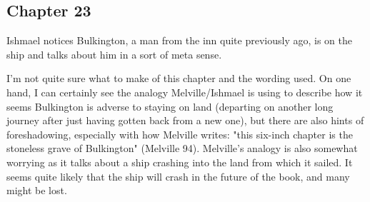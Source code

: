 \subsection{Chapter 23}

Ishmael notices Bulkington, a man from the inn quite previously ago, is on the
ship and talks about him in a sort of meta sense.

I'm not quite sure what to make of this chapter and the wording used. On one
hand, I can certainly see the analogy Melville/Ishmael is using to describe how
it seems Bulkington is adverse to staying on land (departing on another long
journey after just having gotten back from a new one), but there are also hints
of foreshadowing, especially with how Melville writes: "this six-inch chapter
is the stoneless grave of Bulkington" (Melville 94). Melville's analogy is also
somewhat worrying as it talks about a ship crashing into the land from which it
sailed. It seems quite likely that the ship will crash in the future of the
book, and many might be lost.
